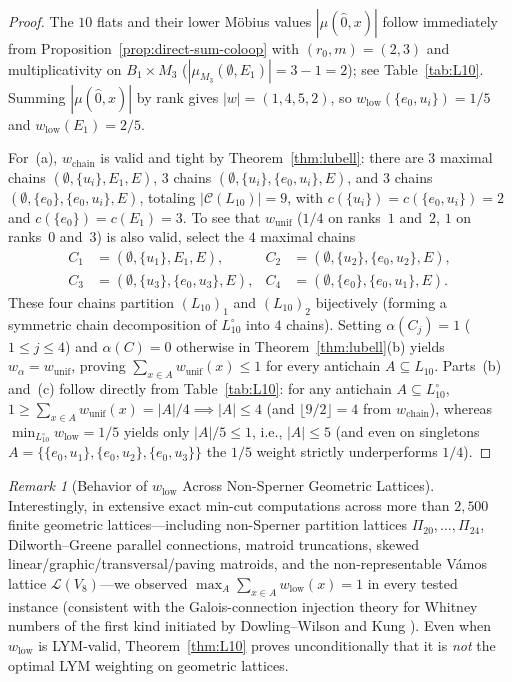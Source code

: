 \documentclass[11pt]{article}
\theoremstyle{definition}
\theoremstyle{remark}
\newtheorem{remark}[theorem]{Remark}
\begin{document}
\begin{proof}
The $10$ flats and their lower M\"obius values $|\mu(\hat{0}, x)|$ follow immediately from Proposition~\ref{prop:direct-sum-coloop} with $(r_0, m) = (2, 3)$ and multiplicativity on $B_1 \times M_3$ ($|\mu_{M_3}(\emptyset, E_1)| = 3 - 1 = 2$); see Table~\ref{tab:L10}. Summing $|\mu(\hat{0}, x)|$ by rank gives $|w| = (1, 4, 5, 2)$, so $w_{\mathrm{low}}(\{e_0, u_i\}) = 1/5$ and $w_{\mathrm{low}}(E_1) = 2/5$.

For~(a), $w_{\mathrm{chain}}$ is valid and tight by Theorem~\ref{thm:lubell}: there are $3$ maximal chains $(\emptyset, \{u_i\}, E_1, E)$, $3$ chains $(\emptyset, \{u_i\}, \{e_0, u_i\}, E)$, and $3$ chains $(\emptyset, \{e_0\}, \{e_0, u_i\}, E)$, totaling $|\mathcal{C}(L_{10})| = 9$, with $c(\{u_i\}) = c(\{e_0, u_i\}) = 2$ and $c(\{e_0\}) = c(E_1) = 3$. To see that $w_{\mathrm{unif}}$ ($1/4$ on ranks~$1$ and~$2$, $1$ on ranks~$0$ and~$3$) is also valid, select the $4$ maximal chains
\[
\begin{aligned}
  C_1 &= (\emptyset, \{u_1\}, E_1, E), &
  C_2 &= (\emptyset, \{u_2\}, \{e_0, u_2\}, E),\\
  C_3 &= (\emptyset, \{u_3\}, \{e_0, u_3\}, E), &
  C_4 &= (\emptyset, \{e_0\}, \{e_0, u_1\}, E).
\end{aligned}
\]
These four chains partition $(L_{10})_1$ and $(L_{10})_2$ bijectively (forming a symmetric chain decomposition of $L_{10}^\circ$ into $4$ chains). Setting $\alpha(C_j) = 1$ ($1 \le j \le 4$) and $\alpha(C) = 0$ otherwise in Theorem~\ref{thm:lubell}(b) yields $w_\alpha = w_{\mathrm{unif}}$, proving $\sum_{x \in A} w_{\mathrm{unif}}(x) \le 1$ for every antichain $A \subseteq L_{10}$. Parts~(b) and~(c) follow directly from Table~\ref{tab:L10}: for any antichain $A \subseteq L_{10}^\circ$, $1 \ge \sum_{x \in A} w_{\mathrm{unif}}(x) = |A|/4 \implies |A| \le 4$ (and $\lfloor 9/2 \rfloor = 4$ from $w_{\mathrm{chain}}$), whereas $\min_{L_{10}^\circ} w_{\mathrm{low}} = 1/5$ yields only $|A|/5 \le 1$, i.e., $|A| \le 5$ (and even on singletons $A = \{\{e_0, u_1\}, \{e_0, u_2\}, \{e_0, u_3\}\}$ the $1/5$ weight strictly underperforms $1/4$).
\end{proof}

\begin{remark}[Behavior of $w_{\mathrm{low}}$ Across Non-Sperner Geometric Lattices]\label{rem:wlow-validity}
Interestingly, in extensive exact min-cut computations across more than $2{,}500$ finite geometric lattices---including non-Sperner partition lattices $\Pi_{20},\dots,\Pi_{24}$, Dilworth--Greene parallel connections, matroid truncations, skewed linear/graphic/transversal/paving matroids, and the non-representable V\'amos lattice $\mathcal{L}(V_8)$---we observed $\max_{A} \sum_{x \in A} w_{\mathrm{low}}(x) = 1$ in every tested instance (consistent with the Galois-connection injection theory for Whitney numbers of the first kind initiated by Dowling--Wilson \cite{DowlingWilson1974} and Kung \cite{Kung1995}). Even when $w_{\mathrm{low}}$ is LYM-valid, Theorem~\ref{thm:L10} proves unconditionally that it is \emph{not} the optimal LYM weighting on geometric lattices.
\end{remark}
\end{document}

